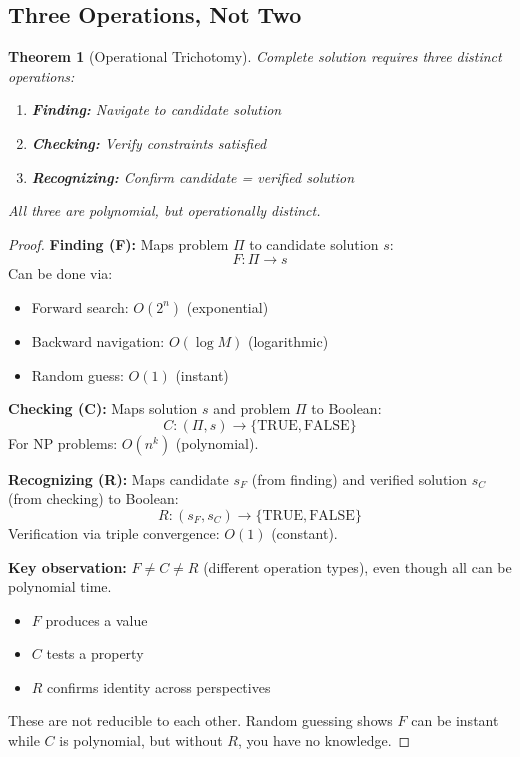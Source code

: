 \documentclass[twocolumn,10pt]{article}
\newtheorem{theorem}{Theorem}[section]
\theoremstyle{definition}
\theoremstyle{remark}
\begin{document}
\subsection{Three Operations, Not Two}

\begin{theorem}[Operational Trichotomy]
\label{thm:three_ops}
Complete solution requires three distinct operations:
\begin{enumerate}
\item \textbf{Finding:} Navigate to candidate solution
\item \textbf{Checking:} Verify constraints satisfied
\item \textbf{Recognizing:} Confirm candidate = verified solution
\end{enumerate}
All three are polynomial, but operationally distinct.
\end{theorem}

\begin{proof}
\textbf{Finding (F):} Maps problem $\Pi$ to candidate solution $s$:
\begin{equation}
F: \Pi \to s
\end{equation}
Can be done via:
\begin{itemize}
\item Forward search: $O(2^n)$ (exponential)
\item Backward navigation: $O(\log M)$ (logarithmic)
\item Random guess: $O(1)$ (instant)
\end{itemize}

\textbf{Checking (C):} Maps solution $s$ and problem $\Pi$ to Boolean:
\begin{equation}
C: (\Pi, s) \to \{\text{TRUE}, \text{FALSE}\}
\end{equation}
For NP problems: $O(n^k)$ (polynomial).

\textbf{Recognizing (R):} Maps candidate $s_F$ (from finding) and verified solution $s_C$ (from checking) to Boolean:
\begin{equation}
R: (s_F, s_C) \to \{\text{TRUE}, \text{FALSE}\}
\end{equation}
Verification via triple convergence: $O(1)$ (constant).

\vspace{0.2cm}
\noindent\textbf{Key observation:} $F \neq C \neq R$ (different operation types), even though all can be polynomial time.

\begin{itemize}
\item $F$ produces a value
\item $C$ tests a property
\item $R$ confirms identity across perspectives
\end{itemize}

These are not reducible to each other. Random guessing shows $F$ can be instant while $C$ is polynomial, but without $R$, you have no knowledge.
\end{proof}
\end{document}
